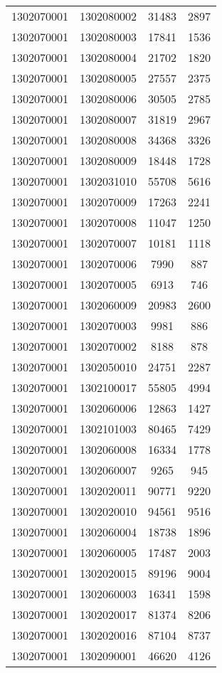 \begin{longtable}[h]{llcc}
		1302070001 & 1302080002 & 31483 & 2897\\
		1302070001 & 1302080003 & 17841 & 1536\\
		1302070001 & 1302080004 & 21702 & 1820\\
		1302070001 & 1302080005 & 27557 & 2375\\
		1302070001 & 1302080006 & 30505 & 2785\\
		1302070001 & 1302080007 & 31819 & 2967\\
		1302070001 & 1302080008 & 34368 & 3326\\
		1302070001 & 1302080009 & 18448 & 1728\\
		1302070001 & 1302031010 & 55708 & 5616\\
		1302070001 & 1302070009 & 17263 & 2241\\
		1302070001 & 1302070008 & 11047 & 1250\\
		1302070001 & 1302070007 & 10181 & 1118\\
		1302070001 & 1302070006 & 7990 & 887\\
		1302070001 & 1302070005 & 6913 & 746\\
		1302070001 & 1302060009 & 20983 & 2600\\
		1302070001 & 1302070003 & 9981 & 886\\
		1302070001 & 1302070002 & 8188 & 878\\
		1302070001 & 1302050010 & 24751 & 2287\\
		1302070001 & 1302100017 & 55805 & 4994\\
		1302070001 & 1302060006 & 12863 & 1427\\
		1302070001 & 1302101003 & 80465 & 7429\\
		1302070001 & 1302060008 & 16334 & 1778\\
		1302070001 & 1302060007 & 9265 & 945\\
		1302070001 & 1302020011 & 90771 & 9220\\
		1302070001 & 1302020010 & 94561 & 9516\\
		1302070001 & 1302060004 & 18738 & 1896\\
		1302070001 & 1302060005 & 17487 & 2003\\
		1302070001 & 1302020015 & 89196 & 9004\\
		1302070001 & 1302060003 & 16341 & 1598\\
		1302070001 & 1302020017 & 81374 & 8206\\
		1302070001 & 1302020016 & 87104 & 8737\\
		1302070001 & 1302090001 & 46620 & 4126\\

\end{longtable}
